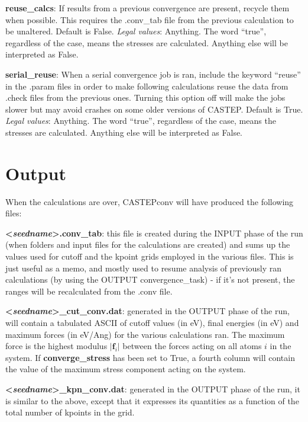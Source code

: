 \documentclass[10pt]{article}
\begin{document}
\textbf{reuse\_calcs}: If results from a previous convergence are present, recycle them when possible. This requires the .conv\_tab file from the previous calculation to be unaltered. Default is False.\newline
\textit{Legal values}: Anything. The word ``true'', regardless of the case, means the stresses are calculated. Anything else will be interpreted as False.\newline

\textbf{serial\_reuse}: When a serial convergence job is ran, include the keyword ``reuse'' in the .param files in order to make following calculations reuse the data from .check files from the previous ones. Turning this option off will make the jobs slower but may avoid crashes on some older versions of CASTEP. Default is True.\newline
\textit{Legal values}: Anything. The word ``true'', regardless of the case, means the stresses are calculated. Anything else will be interpreted as False.\newline

\section{Output}

When the calculations are over, CASTEPconv will have produced the following files:

\textbf{\textless \textit{seedname}\textgreater.conv\_tab}: this file is created during the INPUT phase of the run (when folders and input files for the calculations are created) and sums up the values used for cutoff and the kpoint grids employed in the various files. This is just useful as a memo, and mostly used to resume analysis of previously ran calculations (by using the OUTPUT convergence\_task) - if it's not present, the ranges will be recalculated from the .conv file.

\textbf{\textless \textit{seedname}\textgreater\_cut\_conv.dat}: generated in the OUTPUT phase of the run, will contain a tabulated ASCII of cutoff values (in eV), final energies (in eV) and maximum forces (in eV/Ang) for the various calculations ran. The maximum force is the highest modulus $|\mathbf{f}_i|$ between the forces acting on all atoms $i$ in the system. If \textbf{converge\_stress} has been set to True, a fourth column will contain the value of the maximum stress component acting on the system.

\textbf{\textless \textit{seedname}\textgreater\_kpn\_conv.dat}: generated in the OUTPUT phase of the run, it is similar to the above, except that it expresses its quantities as a function of the total number of kpoints in the grid.
\end{document}
